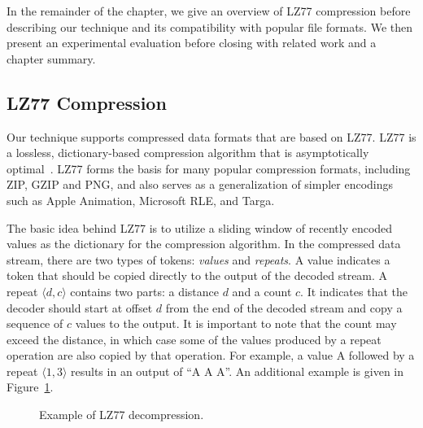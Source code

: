 In the remainder of the chapter, we give an overview of LZ77
compression before describing our technique and its compatibility with
popular file formats.  We then present an experimental evaluation
before closing with related work and a chapter summary.

\newcommand{\tupp}[2]{\langle#1, #2\rangle}

\newcommand{\pos}[0]{\mbox{\it pos}}

\newcommand{\tab}[0]{\mbox{~~~~}}


\subsection*{LZ77 Compression}

Our technique supports compressed data formats that are based on LZ77.
LZ77 is a lossless, dictionary-based compression algorithm that is
asymptotically optimal~\cite{wyner94optimal}.  LZ77 forms the basis
for many popular compression formats, including ZIP, GZIP and PNG, and
also serves as a generalization of simpler encodings such as Apple
Animation, Microsoft RLE, and Targa.

The basic idea behind LZ77 is to utilize a sliding window of recently
encoded values as the dictionary for the compression algorithm.  In
the compressed data stream, there are two types of tokens: {\it
  values} and {\it repeats}.  A value indicates a token that should be
copied directly to the output of the decoded stream.  A repeat
$\langle d, c \rangle$ contains two parts: a distance $d$ and a count
$c$.  It indicates that the decoder should start at offset $d$ from
the end of the decoded stream and copy a sequence of $c$ values to the
output.
It is important to note that the count may exceed the distance, in
which case some of the values produced by a repeat operation are also
copied by that operation.  For example, a value A followed by a repeat
$\tupp{1}{3}$ results in an output of ``A A A''.  An additional example
is given in Figure~\ref{fig:lz77}.

\begin{figure}[t]
\centering
{}
\caption{Example of LZ77 decompression.
\protect\label{fig:lz77}}
\end{figure}

